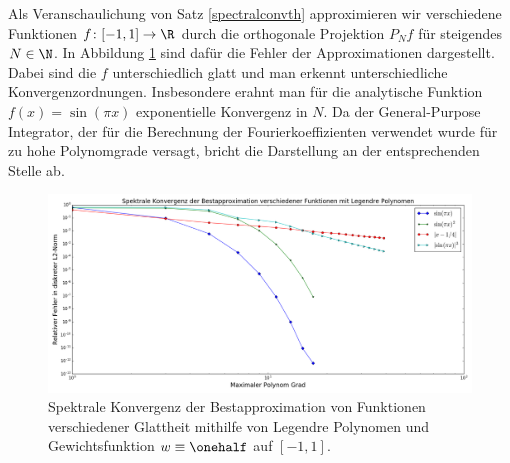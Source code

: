 \begin{mathbsp}
Als Veranschaulichung von Satz \ref{spectralconvth} approximieren wir verschiedene Funktionen $f\colon [-1,1]\to\R$ durch die orthogonale Projektion $P_Nf$ für steigendes $N\in\N$. In Abbildung \ref{figurespectralconverg} sind dafür die Fehler der Approximationen dargestellt. Dabei sind die $f$ unterschiedlich glatt und man erkennt unterschiedliche Konvergenzordnungen. Insbesondere erahnt man für die analytische Funktion $f(x)=\sin(\pi x)$ exponentielle Konvergenz in $N$. Da der General-Purpose Integrator, der für die Berechnung der Fourierkoeffizienten verwendet wurde für zu hohe Polynomgrade versagt, bricht die Darstellung an der entsprechenden Stelle ab.
\begin{figure}[h]
\includegraphics[width=\textwidth]{Figures/spectral_convergence_legendre.png}
\caption{Spektrale Konvergenz der Bestapproximation von Funktionen verschiedener Glattheit mithilfe von Legendre Polynomen und Gewichtsfunktion $w\equiv \onehalf$ auf $[-1,1]$.}
\label{figurespectralconverg}
\end{figure}
\end{mathbsp}